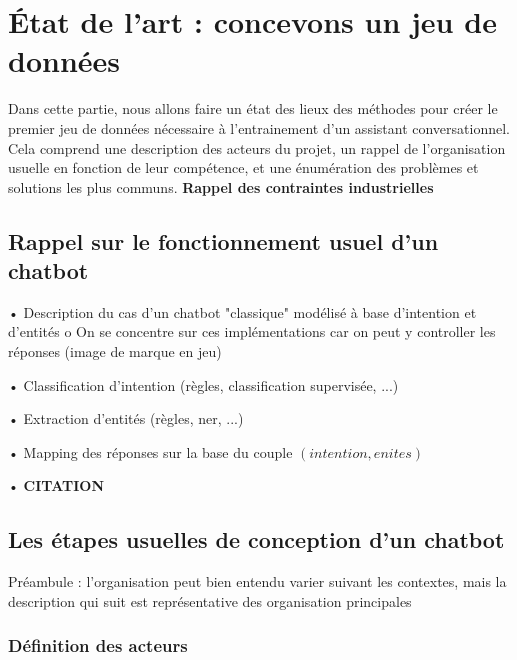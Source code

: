 \chapter{État de l'art : concevons un jeu de données}
    \label{chapter:1_ETAT_DE_L_ART}

    Dans cette partie, nous allons faire un état des lieux des méthodes pour créer le premier jeu de données nécessaire à l'entrainement d'un assistant conversationnel.
    Cela comprend une description des acteurs du projet, un rappel de l'organisation usuelle en fonction de leur compétence, et une énumération des problèmes et solutions les plus communs.
    \textbf{Rappel des contraintes industrielles}

    \minitoc

    \section{Rappel sur le fonctionnement usuel d'un chatbot}

        •	Description du cas d'un chatbot "classique" modélisé à base d'intention et d'entités
            o	 On se concentre sur ces implémentations car on peut y controller les réponses (image de marque en jeu)

        •	Classification d'intention (règles, classification supervisée, ...)

        •	Extraction d'entités (règles, ner, ...)

        •	Mapping des réponses sur la base du couple $(intention, enites)$

        •	\textbf{CITATION}

    \section{Les étapes usuelles de conception d'un chatbot}

        Préambule : l'organisation peut bien entendu varier suivant les contextes, mais la description qui suit est représentative des organisation principales

        \subsection{Définition des acteurs}


